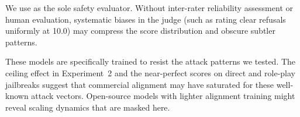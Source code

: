  We use \gptomini as the sole safety evaluator. Without inter-rater reliability assessment or human evaluation, systematic biases in the judge (such as rating clear refusals uniformly at 10.0) may compress the score distribution and obscure subtler patterns.

 These models are specifically trained to resist the attack patterns we tested. The ceiling effect in Experiment~2 and the near-perfect scores on direct and role-play jailbreaks suggest that commercial alignment may have saturated for these well-known attack vectors. Open-source models with lighter alignment training might reveal scaling dynamics that are masked here.
